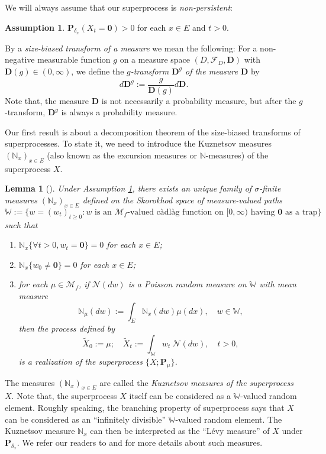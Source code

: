 \documentclass[UTF8]{pkuthss}
\theoremstyle{plain}
\newtheorem{lem}[thm]{Lemma}
\theoremstyle{definition}
\newtheorem{asp}{Assumption}[chapter]
\numberwithin{equation}{section}
\begin{document}
	We will always assume that our superprocess is \emph{non-persistent}:
\begin{asp}\label{asp:1}
	$\mathbf P_{\delta_x}(X_t = \mathbf 0) > 0$ for each $x \in E$ and $t>0$.
\end{asp}
	By a \emph{size-biased transform of a measure} we mean the following:
	For a non-negative measurable function $g$ on a measure space $(D,\mathscr F_D,\mathbf D)$ with $\mathbf D(g)\in (0,\infty)$, we define  the \emph{$g$-transform $\mathbf D^g$ of the measure $\mathbf D$} by
\[
	d\mathbf D^g
	:= \frac{g}{\mathbf D(g)} d\mathbf D.
\]
	Note that, the measure $\mathbf D$ is not necessarily a probability measure, but after the $g$-transform, $\mathbf D^g$ is always a probability measure.
	
	Our first result is about a decomposition theorem of the size-biased transforms of superprocesses.
	To state it, we need to introduce the Kuznetsov measures $(\mathbb N_x)_{x\in E}$ (also known as the excursion measures or $\mathbb N$-measures) of the superprocess $X$.
\begin{lem}[{\cite[Section 8.4 \& Theorem 8.24]{Li2011Measure-valued}}]
\label{lem: Kuznetsov measures}
	Under Assumption \ref{asp:1}, there exists an unique family of $\sigma$-finite measures $(\mathbb N_x)_{x\in E}$ defined on the Skorokhod space of measure-valued paths
\[
	\mathbb W :=\{ w= (w_t)_{t\geq 0}: w \text{ is an $\mathcal M_f$-valued c\`{a}dl\`{a}g function on $[0,\infty)$ having $\mathbf 0$ as a trap}\}
\]
	such that
\begin{enumerate}
\item
    $\mathbb N_x \{\forall t > 0, w_t=\mathbf 0\} =0$ for each $x\in E$;
\item
    $\mathbb N_x\{w_0 \neq \mathbf 0\} = 0$ for each $x\in E$;
\item
    for each $\mu \in \mathcal M_f$, if $\mathcal N(dw)$ is a Poisson random measure on $\mathbb W$ with mean measure
\[
  \mathbb N_\mu(dw):= \int_E \mathbb N_x(dw)\mu(dx), \quad w\in \mathbb W,
\]
  then the process defined by
\[
	\widetilde X_0 := \mu;
	\quad \widetilde X_t
	:=\int_{\mathbb W}w_t~\mathcal N(dw),
	\quad t>0,
\]
	is a realization of the superprocess $\{X; \mathbf P_{\mu}\}$.
\end{enumerate}
\end{lem}
The measures $(\mathbb N_x)_{x\in E}$ are called the \emph{Kuznetsov measures of the superprocess $X$}.
		Note that, the superprocess $X$ itself can be considered as a $\mathbb W$-valued random element.
    Roughly speaking, the branching property of superprocess  says that $X$ can be considered as an ``infinitely divisible'' $\mathbb W$-valued random element.
		The Kuznetsov measure $\mathbb N_x$ can then be interpreted as the ``L\'{e}vy measure'' of $X$ under $\mathbf P_{\delta_x}$.
	We refer our readers to \cite{DynkinKuznetsov2004N-measure} and \cite[Section 8.4]{Li2011Measure-valued} for more details about such measures.
\end{document}

